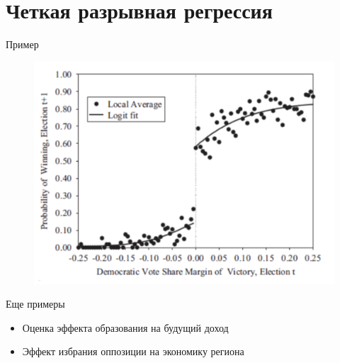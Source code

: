 \section{Четкая разрывная регрессия}


\begin{frame}{Пример \parencite{lee2008randomized}}
    \begin{figure}
        \centering
        \includegraphics[width=\textwidth]{Lecture_Sources/Images/rdd_votes.png}
    \end{figure}
\end{frame}

\begin{frame}{Еще примеры} %

\begin{itemize}
    \item Оценка эффекта образования на будущий доход
    \item Эффект избрания оппозиции на экономику региона
\end{itemize}

\end{frame}


